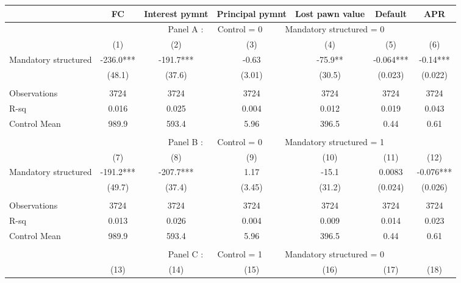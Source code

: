 \begin{tabular}{lcccccc}
\toprule
      & FC    & Interest pymnt & Principal pymnt & Lost pawn value & Default & APR \\
\midrule
      & \multicolumn{6}{c}{Panel A : $\quad$ Control  = 0           $\quad\quad$                 Mandatory structured  = 0} \\
\midrule
\midrule
      & (1)   & (2)   & (3)   & (4)   & (5)   & (6) \\
\midrule
\midrule
Mandatory structured & -236.0*** & -191.7*** & -0.63 & -75.9** & -0.064*** & -0.14*** \\
      & (48.1) & (37.6) & (3.01) & (30.5) & (0.023) & (0.022) \\
      &       &       &       &       &       &  \\
\midrule
Observations & 3724  & 3724  & 3724  & 3724  & 3724  & 3724 \\
R-sq  & 0.016 & 0.025 & 0.004 & 0.012 & 0.019 & 0.043 \\
Control Mean & 989.9 & 593.4 & 5.96  & 396.5 & 0.44  & 0.61 \\
\midrule
\midrule
      &       &       &       &       &       &  \\
\midrule
      & \multicolumn{6}{c}{Panel B : $\quad$ Control  = 0         $\quad\quad$                    Mandatory structured = 1} \\
\midrule
\midrule
      & (7)   & (8)   & (9)   & (10)  & (11)  & (12) \\
\midrule
\midrule
Mandatory structured & -191.2*** & -207.7*** & 1.17  & -15.1 & 0.0083 & -0.076*** \\
      & (49.7) & (37.4) & (3.45) & (31.2) & (0.024) & (0.026) \\
      &       &       &       &       &       &  \\
\midrule
Observations & 3724  & 3724  & 3724  & 3724  & 3724  & 3724 \\
R-sq  & 0.013 & 0.026 & 0.004 & 0.009 & 0.014 & 0.023 \\
Control Mean & 989.9 & 593.4 & 5.96  & 396.5 & 0.44  & 0.61 \\
\midrule
\midrule
      &       &       &       &       &       &  \\
\midrule
      & \multicolumn{6}{c}{Panel C : $\quad$ Control  = 1        $\quad\quad$                     Mandatory structured = 0} \\
\midrule
\midrule
      & (13)  & (14)  & (15)  & (16)  & (17)  & (18) \\

\end{tabular}
